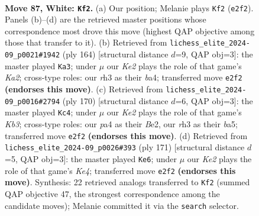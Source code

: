 \documentclass[11pt]{article}
\begin{document}
\clearpage

\begin{figure}[p]\centering
\begin{subfigure}{0.46\textwidth}\centering
\resizebox{\linewidth}{!}{%
\newchessgame
\chessboard[
  setfen={8/8/8/2p1k3/p2p4/7r/4K3/8 w - - 14 87},
  showmover=false,
  pgfstyle=straightmove, color=movearrow, markmove={e2-f2}
]}
\caption{}
\end{subfigure}\hfill
\begin{subfigure}{0.46\textwidth}\centering
\resizebox{\linewidth}{!}{%
\newchessgame
\chessboard[
  setfen={8/8/8/8/b1kp4/2p5/K7/8 w - - 6 83},
  showmover=false,
  pgfstyle=straightmove, color=movearrow, markmove={a2-a3}
]}
\caption{}
\end{subfigure}
\\[4pt]
\begin{subfigure}{0.46\textwidth}\centering
\resizebox{\linewidth}{!}{%
\newchessgame
\chessboard[
  setfen={8/8/8/b7/8/1K2p3/4Bpk1/8 w - - 6 86},
  showmover=false,
  pgfstyle=straightmove, color=movearrow, markmove={b3-c4}
]}
\caption{}
\end{subfigure}\hfill
\begin{subfigure}{0.46\textwidth}\centering
\resizebox{\linewidth}{!}{%
\newchessgame
\chessboard[
  setfen={5R2/8/8/4k2p/7P/6P1/6K1/8 b - - 2 86},
  showmover=false,
  pgfstyle=straightmove, color=movearrow, markmove={e5-e6}
]}
\caption{}
\end{subfigure}
\caption{\textbf{Move 87, White: \texttt{Kf2}.} (a) Our position; Melanie plays \texttt{Kf2} (\texttt{e2f2}). Panels (b)--(d) are the retrieved master positions whose correspondence most drove this move (highest QAP objective among those that transfer to it). (b) Retrieved from \texttt{lichess\_elite\_2024-09\_p0021\#1942} (ply 164) [structural distance $d$=9, QAP obj=3]: the master played \texttt{Ka3}; under $\mu$ our \emph{Ke2} plays the role of that game's \emph{Ka2}; cross-type roles: our \emph{r}h3 as their \emph{b}a4; transferred move \texttt{e2f2} \textbf{(endorses this move)}. (c) Retrieved from \texttt{lichess\_elite\_2024-09\_p0016\#2794} (ply 170) [structural distance $d$=6, QAP obj=3]: the master played \texttt{Kc4}; under $\mu$ our \emph{Ke2} plays the role of that game's \emph{Kb3}; cross-type roles: our \emph{p}a4 as their \emph{B}e2, our \emph{r}h3 as their \emph{b}a5; transferred move \texttt{e2f2} \textbf{(endorses this move)}. (d) Retrieved from \texttt{lichess\_elite\_2024-09\_p0026\#393} (ply 171) [structural distance $d$=5, QAP obj=3]: the master played \texttt{Ke6}; under $\mu$ our \emph{Ke2} plays the role of that game's \emph{Ke4}; transferred move \texttt{e2f2} \textbf{(endorses this move)}. Synthesis: 22 retrieved analogs transferred to \texttt{Kf2} (summed QAP objective 47, the strongest correspondence among the candidate moves); Melanie committed it via the \texttt{search} selector.}
\label{fig:thought-m172}
\end{figure}
\end{document}
